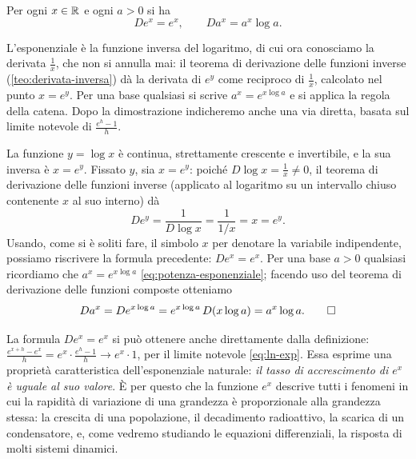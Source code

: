 \begin{proposizione}\label{prop:derivata-exp}
Per ogni $x\in\mathbb{R}$ e ogni $a>0$ si ha
\begin{equation}\label{eq:derivata-exp}
  De^{x}=e^{x}, \qquad Da^{x}=a^{x}\log a .
\end{equation}
\end{proposizione}

\begin{schema}
\end{schema}

\begin{strategia}
L'esponenziale è la funzione inversa del logaritmo, di cui ora conosciamo la derivata
$\frac1x$, che non si annulla mai: il teorema di derivazione delle funzioni inverse
(\cref{teo:derivata-inversa}) dà la derivata di $e^{y}$ come reciproco di $\frac1x$,
calcolato nel punto $x=e^{y}$. Per una base qualsiasi si scrive $a^{x}=e^{x\log a}$ e si
applica la regola della catena. Dopo la dimostrazione indicheremo anche una via diretta,
basata sul limite notevole di $\frac{e^{h}-1}{h}$.
\end{strategia}

\begin{dimostrazione}
La funzione $y=\log x$ è continua, strettamente crescente e invertibile, e la sua
inversa è $x=e^{y}$. Fissato $y$, sia $x=e^{y}$: poiché $D\log x=\frac1x\neq0$, il
teorema di derivazione delle funzioni inverse (applicato al logaritmo su un intervallo
chiuso contenente $x$ al suo interno) dà
\begin{equation}\label{eq:derivata-exp-inversa}
  De^{y}=\frac1{D\log x}=\frac1{1/x}=x=e^{y}.
\end{equation}
Usando, come si è soliti fare, il simbolo $x$ per denotare la variabile indipendente,
possiamo riscrivere la formula precedente: $De^{x}=e^{x}$. Per una base $a>0$ qualsiasi
ricordiamo che $a^{x}=e^{x\log a}$ \eqref{eq:potenza-esponenziale}; facendo uso del
teorema di derivazione delle funzioni composte otteniamo
\begin{equation}\label{eq:derivata-ax}
  Da^{x}=De^{x\log a}=e^{x\log a}\,D(x\log a)=a^{x}\log a . \qedhere
\end{equation}
\end{dimostrazione}

La formula $De^{x}=e^{x}$ si può ottenere anche direttamente dalla definizione:
$\frac{e^{x+h}-e^{x}}{h}=e^{x}\cdot\frac{e^{h}-1}{h}\to e^{x}\cdot1$, per il limite
notevole \eqref{eq:ln-exp}. Essa esprime una proprietà caratteristica dell'esponenziale
naturale: \emph{il tasso di accrescimento di $e^{x}$ è uguale al suo valore}. È per
questo che la funzione $e^{x}$ descrive tutti i fenomeni in cui la rapidità di
variazione di una grandezza è proporzionale alla grandezza stessa: la crescita di una
popolazione, il decadimento radioattivo, la scarica di un condensatore, e, come vedremo
studiando le equazioni differenziali, la risposta di molti sistemi dinamici.

